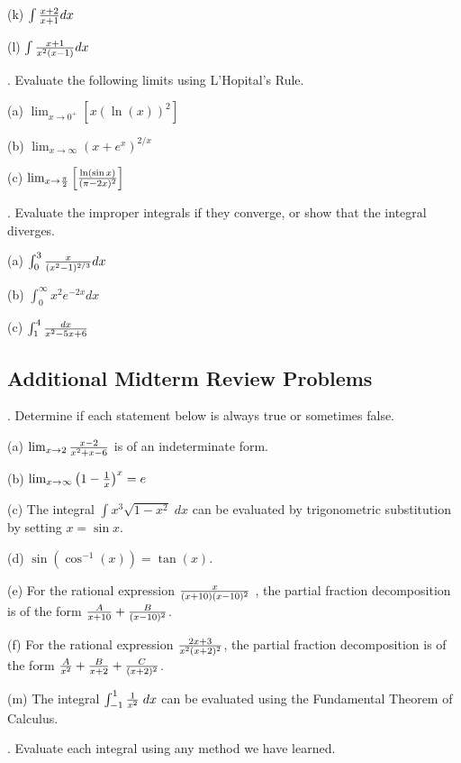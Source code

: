 \documentclass[12pt]{article}
\begin{document}
\noindent (k) $\int {{x+2}\over{x+1}} dx$

\noindent (l) $\int {{x+1}\over{x^2(x-1)}} dx$

\medskip
{}.  Evaluate the following limits using L'Hopital's Rule.

\noindent (a) $\lim_{x \to 0^+} [x (\ln(x))^2]$

\noindent (b) $\lim_{x \to \infty} (x + e^x)^{2/x}$

\noindent (c) $\lim_{x \to {{\pi}\over{2}}} \left [ {{\ln (\sin x)}\over{(\pi - 
2x)^2}} \right ]$

\bigskip
{}.  Evaluate the improper integrals if they converge, or show 
that the integral diverges.

\noindent (a) $\int_0^3 {{x}\over{(x^2-1)^{2/3}}} dx$

\noindent (b) $\int_0^{\infty} x^2 e^{-2x}dx$

\noindent (c) $\int_1^4 {{dx}\over{x^2-5x+6}}$

\subsection*{Additional Midterm Review Problems}

. Determine if each statement below is always true or sometimes 
false.

\noindent (a) $\lim_{x\to 2} {{x-2}\over{x^2+x-6}}$ is of an 
indeterminate form.

\smallskip
\noindent (b) $\lim_{x\to \infty} \left ( 1-{{1}\over{x}} \right )^x=e$

\smallskip
\noindent (c) The integral $\int x^3 \sqrt{1-x^2} \; dx$ can be evaluated by 
trigonometric substitution by setting $x=\sin x$.

\smallskip
\noindent (d) $\sin(\cos^{-1}(x)) = \tan (x)$.

\smallskip
\noindent (e) For the rational expression ${{x}\over{(x+10)(x-10)^2}}$ , the 
partial fraction decomposition is of the form ${{A}\over{x+10}} + 
{{B}\over{(x-10)^2}}$.

\smallskip
\noindent (f) For the rational expression ${{2x+3}\over{x^2 (x+2)^2}}$, the 
partial fraction decomposition is of the form 
${{A}\over{x^2}}+{{B}\over{x+2}}+{{C}\over{(x+2)^2}}$.

\smallskip
\noindent (m) The integral $\int_{-1}^1 {{1}\over{x^2}} \; dx$ can be evaluated 
using the Fundamental Theorem of Calculus.

.  Evaluate each integral using any method we have learned.
\end{document}
